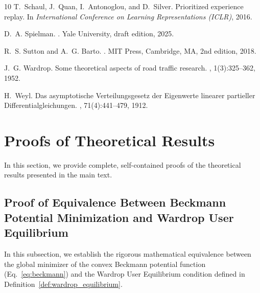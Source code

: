 \documentclass[11pt,a4paper]{article}
\begin{document}
\begin{thebibliography}{10}
T.~Schaul, J.~Quan, I.~Antonoglou, and D.~Silver.
\newblock Prioritized experience replay.
\newblock In {\em International Conference on Learning Representations (ICLR)}, 2016.

D.~A. Spielman.
.
\newblock Yale University, draft edition, 2025.

R.~S. Sutton and A.~G. Barto.
.
\newblock MIT Press, Cambridge, MA, 2nd edition, 2018.

J.~G. Wardrop.
\newblock Some theoretical aspects of road traffic research.
, 1(3):325--362, 1952.

H.~Weyl.
\newblock Das asymptotische {V}erteilungsgesetz der {E}igenwerte linearer partieller {D}ifferentialgleichungen.
, 71(4):441--479, 1912.

\end{thebibliography}

\clearpage
\appendix

\section{Proofs of Theoretical Results}
\label{sec:appendix_proofs}

In this section, we provide complete, self-contained proofs of the theoretical results presented in the main text.

\subsection{Proof of Equivalence Between Beckmann Potential Minimization and Wardrop User Equilibrium}
\label{subsec:proof_beckmann_wardrop}

In this subsection, we establish the rigorous mathematical equivalence between the global minimizer of the convex Beckmann potential function (Eq.~\eqref{eq:beckmann}) and the Wardrop User Equilibrium condition defined in Definition~\ref{def:wardrop_equilibrium}.
\end{document}
